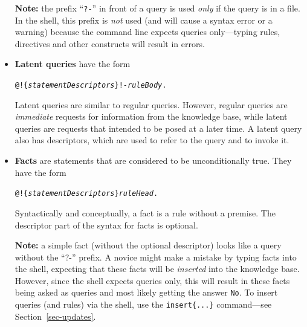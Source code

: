 \documentclass[11pt]{article}
\newcommand{\ERGO}{\mbox{\smaller{\ensuremath{\cal{E}}\smaller{{\sc{RGO}}}}}\xspace}
\newcommand{\FLSYSTEM}{\ERGO}
\begin{document}
\begin{itemize}
  \textbf{Note:} the prefix ``\texttt{?-}'' in front of a query is used
  \emph{only} if the query is in a file. In the \FLSYSTEM shell,
  this prefix is \emph{not} used (and will cause a syntax error or a
  warning)
  because the \ERGO command line expects queries only---typing rules, directives and
  other constructs will result in errors.
\item \textbf{Latent queries} have the form
\begin{alltt}
     @!\{\emph{statementDescriptors}\}  !- \emph{ruleBody}.
\end{alltt}
  Latent queries are similar to regular queries. However, regular
  queries are \emph{immediate} requests for information
  from the knowledge base, while latent queries are requests that intended to
  be posed at a later time.  A latent query also has descriptors, which are
  used to refer to the query and to invoke it.
\item \textbf{Facts} are statements that are considered to be
  unconditionally true. They have the form\
\begin{alltt}
     @!\{\emph{statementDescriptors}\}  \emph{ruleHead}.
\end{alltt}
  Syntactically and conceptually, a fact is a rule without a premise.
  The descriptor part of the syntax for facts is optional.

  \textbf{Note:} a simple fact (without the optional descriptor) looks
  like a query without the ``?-'' prefix. A novice might make a mistake
  by typing facts into the \FLSYSTEM shell, expecting that these facts
  will be \emph{inserted} into the knowledge base. However, since the shell
  expects queries only, this will result in these facts being asked as queries
  and most likely getting the answer \texttt{No}. To insert queries (and
  rules) via the \FLSYSTEM shell, use the \texttt{insert\{...\}}
  command---see Section~\ref{sec-updates}.
\end{itemize}
\end{document}
